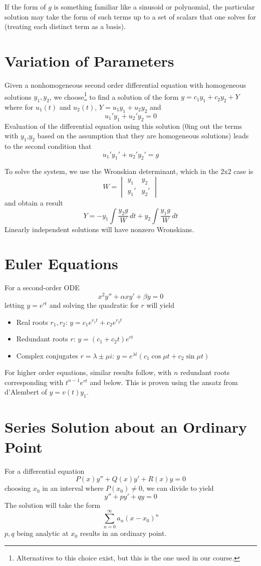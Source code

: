 \documentclass{article}
\begin{document}
If the form of $g$ is something familiar like a sinusoid or polynomial, the particular solution may take the form of such terms up to a set of scalars that one solves for (treating each distinct term as a basis).

\section{Variation of Parameters}
Given a nonhomogeneous second order differential equation with homogeneous solutions $y_1,y_2$, we choose\footnote{Alternatives to this choice exist, but this is the one used in our course.} to find a solution of the form $y=c_1y_1+c_2y_2+Y$ where for $u_1(t)$ and $u_2(t)$, $Y=u_1y_1 + u_2y_2$ and $$u_1'y_1+u_2'y_2=0$$
Evaluation of the differential equation using this solution ($0$ing out the terms with $y_1$,$y_2$ based on the assumption that they are homogeneous solutions) leads to the second condition that
$$u_1'y_1'+u_2'y_2'=g$$

To solve the system, we use the Wronskian determinant, which in the 2x2 case is
$$W=\begin{vmatrix}
    y_1 & y_2\\ y_1' & y_2'
\end{vmatrix}$$
and obtain a result
$$Y=-y_1\int\frac{y_2g}{W}\,dt + y_2\int\frac{y_1g}{W}\,dt$$
Linearly independent solutions will have nonzero Wronskians.


\section{Euler Equations}
For a second-order ODE
$$x^2y''+\alpha xy' + \beta y = 0$$
letting $y=e^{rt}$ and solving the quadratic for $r$ will yield
\begin{itemize}
    \item Real roots $r_1,r_2$: $y=c_1e^{r_1t} + c_2e^{r_2t}$
    \item Redundant roots $r$: $y=(c_1+c_2t)e^{rt}$
    \item Complex conjugates $r=\lambda\pm\mu i$: $y=e^{\lambda t}(c_1\cos{\mu t} + c_2\sin{\mu t})$ 
\end{itemize}

For higher order equations, similar results follow, with $n$ redundant roots corresponding with $t^{n-1}e^{rt}$ and below. This is proven using the ansatz from d'Alembert of $y=v(t)y_1$.

\section{Series Solution about an Ordinary Point}
For a differential equation
$$P(x)y''+Q(x)y'+R(x)y=0$$
choosing $x_0$ in an interval where $P(x_0)\ne0$, we can divide to yield
$$y''+py'+qy=0$$
The solution will take the form $$\sum_{n=0}^\infty a_n(x-x_0)^n$$
$p,q$ being analytic at $x_0$ results in an ordinary point.
\end{document}

